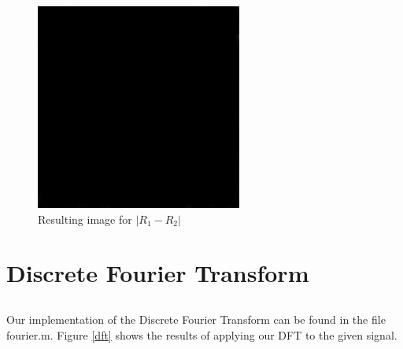 \documentclass{article}
\begin{document}
\begin{figure}[H]
	\begin{center}
		\includegraphics[width=\textwidth]{./images/imDiff.png}
		\caption{Resulting image for $\left|R_1 - R_2\right|$} 
    \label{lenaDiff}
	\end{center}
\end{figure}

\clearpage
\section{Discrete Fourier Transform}
\subsection{}
Our implementation of the Discrete Fourier Transform can be found in the file fourier.m. Figure \ref{dft} shows the results of applying our DFT to the given signal.
\end{document}
